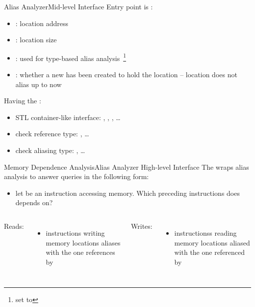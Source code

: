 \begin{frame}{Alias Analyzer}{Mid-level Interface}
Entry point is :

\begin{itemize}
\item {}: location address
\item {}: location size
\item {}: used for type-based alias
      analysis~\footnote{set to }
\item {}: whether a new  has been
      created to hold the location -- location does not alias up to now
\end{itemize}

\vfill
Having the :

\begin{itemize}
\item STL container-like interface: , ,
      , \ldots
\item check reference type: , \ldots
\item check aliasing type: , \ldots
\end{itemize}
\end{frame}

\begin{frame}{Memory Dependence Analysis}{Alias Analyzer High-level Interface}
The  wraps alias analysis to answer
queries in the following form:

\begin{itemize}
\item let  be an instruction accessing memory. Which
      preceding instructions does  depends on?
\end{itemize}

\vfill
\begin{columns}[t]
Reads:

\begin{itemize}
\item {} instructions writing memory locations aliases with
      the one references by 
\end{itemize}

Writes:

\begin{itemize}
\item {} instructionss reading memory locations aliased with
      the one referenced by 
\end{itemize}
\end{columns}
\end{frame}

